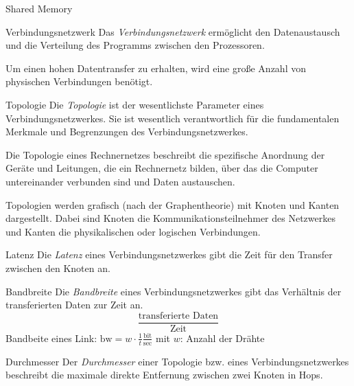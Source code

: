 \begin{defi}{Shared Memory}
    \begin{defi}{Verbindungsnetzwerk}
        Das \emph{Verbindungsnetzwerk} ermöglicht den Datenaustausch und die Verteilung des Programms zwischen den Prozessoren.

        Um einen hohen Datentransfer zu erhalten, wird eine große Anzahl von physischen Verbindungen benötigt.
    \end{defi}

    \begin{defi}[Verbindungsnetzwerk]{Topologie}
        Die \emph{Topologie} ist der wesentlichste Parameter eines Verbindungsnetzwerkes.
        Sie ist wesentlich verantwortlich für die fundamentalen Merkmale und Begrenzungen des Verbindungsnetzwerkes.

        Die Topologie eines Rechnernetzes beschreibt die spezifische Anordnung der Geräte und Leitungen, die ein Rechnernetz bilden, über das die Computer untereinander verbunden sind und Daten austauschen.

        Topologien werden grafisch (nach der Graphentheorie) mit Knoten und Kanten dargestellt.
        Dabei sind Knoten die Kommunikationsteilnehmer des Netzwerkes und Kanten die physikalischen oder logischen Verbindungen.
    \end{defi}

    \begin{defi}[Verbindungsnetzwerk]{Latenz}
        Die \emph{Latenz} eines Verbindungsnetzwerkes gibt die Zeit für den Transfer zwischen den Knoten an.
    \end{defi}

    \begin{defi}[Verbindungsnetzwerk]{Bandbreite}
        Die \emph{Bandbreite} eines Verbindungsnetzwerkes gibt das Verhältnis der transferierten Daten zur Zeit an.
        \[\frac{\text{transferierte Daten}}{\text{Zeit}}\]
        Bandbeite eines Link: $\text{bw} = w \cdot \frac{1}{t}\frac{\text{bit}}{\text{sec}}$
        mit $w$: Anzahl der Drähte
    \end{defi}

    \begin{defi}[Verbindungsnetzwerk]{Durchmesser}
        Der \emph{Durchmesser} einer Topologie bzw. eines Verbindungsnetzwerkes beschreibt die maximale direkte Entfernung zwischen zwei Knoten in Hops.


\end{defi}
\end{defi}
